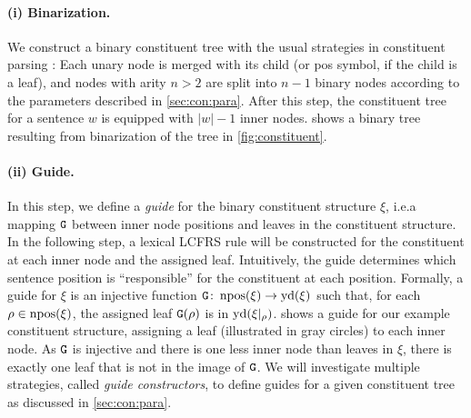 \documentclass[../document.tex]{subfiles}
\begin{document}
%        

    \paragraph{(i) Binarization.}
    We construct a binary constituent tree with the usual strategies in constituent parsing \cite{KalMai13}:
    Each unary node is merged with its child (or pos symbol, if the child is a leaf), and nodes with arity \(n>2\) are split into \(n-1\) binary nodes according to the parameters described in \cref{sec:con:para}.
    After this step, the constituent tree for a sentence \(w\) is equipped with \(|w|-1\) inner nodes.
     shows a binary tree resulting from binarization of the tree in \cref{fig:constituent}.

    \paragraph{(ii) Guide.}
    In this step, we define a \emph{guide} for the binary constituent structure \(\xi\), i.e.\@ a mapping \(\texttt{G}\) between inner node positions and leaves in the constituent structure.
    In the following step, a lexical LCFRS rule will be constructed for the constituent at each inner node and the assigned leaf.
    Intuitively, the guide determines which sentence position is ``responsible'' for the constituent at each position.
    Formally, a guide for \(\xi\) is an injective function \(\texttt{G}\colon \operatorname{npos}(\xi) \to \operatorname{yd}(\xi)\) such that, for each \(\rho \in \operatorname{npos}(\xi)\), the assigned leaf \(\texttt{G}(\rho)\) is in \(\operatorname{yd}(\xi|_\rho)\).
     shows a guide for our example constituent structure, assigning a leaf (illustrated in gray circles) to each inner node.
    As \(\texttt{G}\) is injective and there is one less inner node than leaves in \(\xi\), there is exactly one leaf that is not in the image of \(\texttt{G}\).
    We will investigate multiple strategies, called \emph{guide constructors}, to define guides for a given constituent tree as discussed in \cref{sec:con:para}.
\end{document}
